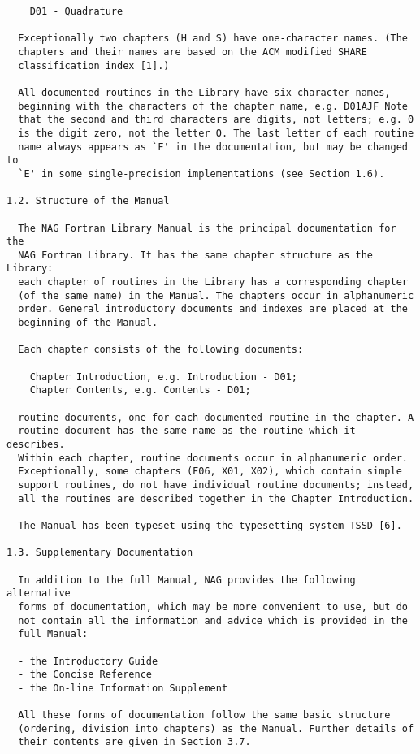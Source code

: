 \begin{verbatim}
    D01 - Quadrature
 
  Exceptionally two chapters (H and S) have one-character names. (The
  chapters and their names are based on the ACM modified SHARE
  classification index [1].)
 
  All documented routines in the Library have six-character names,
  beginning with the characters of the chapter name, e.g. D01AJF Note
  that the second and third characters are digits, not letters; e.g. 0
  is the digit zero, not the letter O. The last letter of each routine
  name always appears as `F' in the documentation, but may be changed to
  `E' in some single-precision implementations (see Section 1.6).
 
1.2. Structure of the Manual
 
  The NAG Fortran Library Manual is the principal documentation for the
  NAG Fortran Library. It has the same chapter structure as the Library:
  each chapter of routines in the Library has a corresponding chapter
  (of the same name) in the Manual. The chapters occur in alphanumeric
  order. General introductory documents and indexes are placed at the
  beginning of the Manual.
 
  Each chapter consists of the following documents:
 
    Chapter Introduction, e.g. Introduction - D01;
    Chapter Contents, e.g. Contents - D01;
 
  routine documents, one for each documented routine in the chapter. A
  routine document has the same name as the routine which it describes.
  Within each chapter, routine documents occur in alphanumeric order.
  Exceptionally, some chapters (F06, X01, X02), which contain simple
  support routines, do not have individual routine documents; instead,
  all the routines are described together in the Chapter Introduction.
 
  The Manual has been typeset using the typesetting system TSSD [6].
 
1.3. Supplementary Documentation
 
  In addition to the full Manual, NAG provides the following alternative
  forms of documentation, which may be more convenient to use, but do
  not contain all the information and advice which is provided in the
  full Manual:
 
  - the Introductory Guide
  - the Concise Reference
  - the On-line Information Supplement
 
  All these forms of documentation follow the same basic structure
  (ordering, division into chapters) as the Manual. Further details of
  their contents are given in Section 3.7.
 

\end{verbatim}
